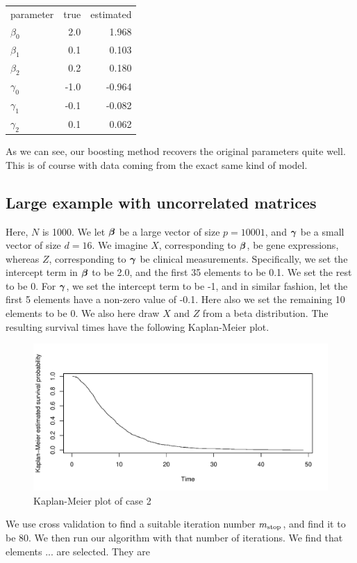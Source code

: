 \begin{tabular}{lrr}
    parameter  & true & estimated \\
    $\beta_0$  &  2.0 &     1.968 \\
    $\beta_1$  &  0.1 &     0.103 \\
    $\beta_2$  &  0.2 &     0.180 \\
    $\gamma_0$ & -1.0 &    -0.964 \\
    $\gamma_1$ & -0.1 &    -0.082 \\
    $\gamma_2$ &  0.1 &     0.062 \\
\end{tabular}

As we can see, our boosting method recovers the original parameters quite well. This is of course with data coming from the exact same kind of model.

\subsection{Large example with uncorrelated matrices}
Here, $N$ is 1000. We let $\boldsymbol{\beta}$ be a large vector of size $p=10001$, and $\boldsymbol{\gamma}$ be a small vector of size $d=16$. We imagine $X$, corresponding to $\boldsymbol{\beta}$, be gene expressions, whereas $Z$, corresponding to $\boldsymbol{\gamma}$ be clinical measurements. Specifically, we set the intercept term in $\boldsymbol{\beta}$ to be 2.0, and the first 35 elements to be 0.1. We set the rest to be 0. For $\boldsymbol{\gamma}$, we set the intercept term to be -1, and in similar fashion, let the first 5 elements have a non-zero value of -0.1. Here also we set the remaining 10 elements to be 0.
We also here draw $X$ and $Z$ from a beta distribution. The resulting survival times have the following Kaplan-Meier plot.
\begin{figure}
\caption{Kaplan-Meier plot of case 2}
\centering\includegraphics[scale=0.4]{figures/case2.pdf}
\end{figure}
We use cross validation to find a suitable iteration number $m_{\text{stop}}$, and find it to be 80. We then run our algorithm with that number of iterations. We find that elements ... are selected. They are 

